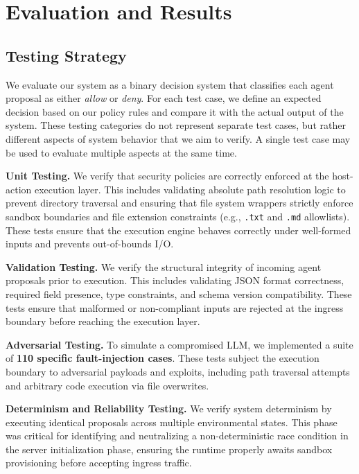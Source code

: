 \documentclass[conference]{IEEEtran}
\begin{document}
\section{Evaluation and Results}

\subsection{Testing Strategy}

We evaluate our system as a binary decision system that classifies each agent proposal as either \textit{allow} or \textit{deny}. For each test case, we define an expected decision based on our policy rules and compare it with the actual output of the system. These testing categories do not represent separate test cases, but rather different aspects of system behavior that we aim to verify. A single test case may be used to evaluate multiple aspects at the same time.

\textbf{Unit Testing.}  
We verify that security policies are correctly enforced at the host-action execution layer. 
This includes validating absolute path resolution logic to prevent directory traversal 
and ensuring that file system wrappers strictly enforce sandbox boundaries and file extension constraints (e.g., \verb|.txt| and \verb|.md| allowlists). These tests ensure that the execution engine behaves correctly under well-formed inputs 
and prevents out-of-bounds I/O.

\textbf{Validation Testing.}  
We verify the structural integrity of incoming agent proposals prior to execution. This includes validating JSON format correctness, required field presence, type constraints, and schema version compatibility. 
These tests ensure that malformed or non-compliant inputs are rejected at the ingress boundary before reaching the execution layer.

\textbf{Adversarial Testing.}  
To simulate a compromised  LLM, we implemented a suite of \textbf{110 specific fault-injection cases}. These tests subject the execution boundary to adversarial payloads and exploits, including path traversal attempts and arbitrary code execution via file overwrites. 

\textbf{Determinism and Reliability Testing.}  
We verify system determinism by executing identical proposals across multiple environmental states. This phase was critical for identifying and neutralizing a non-deterministic race condition in the server initialization phase, ensuring the runtime properly awaits sandbox provisioning before accepting ingress traffic.
\end{document}
